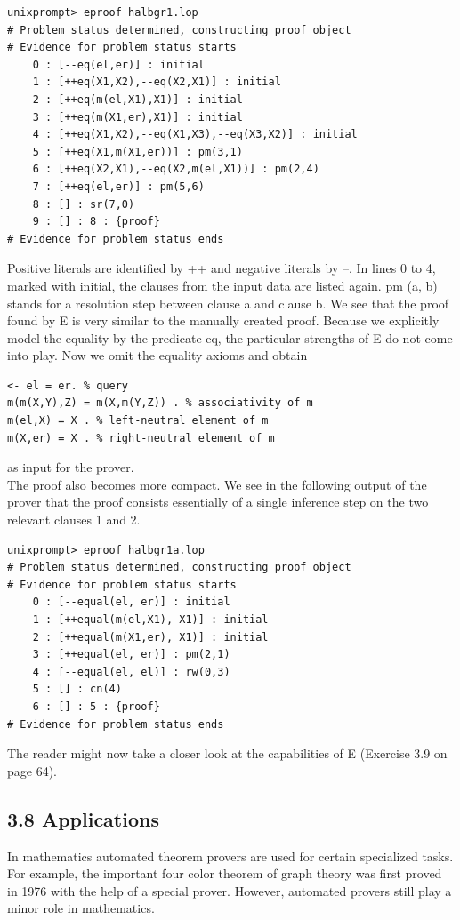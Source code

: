\documentclass[10pt]{article}
\begin{document}
\begin{verbatim}
unixprompt> eproof halbgr1.lop
# Problem status determined, constructing proof object
# Evidence for problem status starts
    0 : [--eq(el,er)] : initial
    1 : [++eq(X1,X2),--eq(X2,X1)] : initial
    2 : [++eq(m(el,X1),X1)] : initial
    3 : [++eq(m(X1,er),X1)] : initial
    4 : [++eq(X1,X2),--eq(X1,X3),--eq(X3,X2)] : initial
    5 : [++eq(X1,m(X1,er))] : pm(3,1)
    6 : [++eq(X2,X1),--eq(X2,m(el,X1))] : pm(2,4)
    7 : [++eq(el,er)] : pm(5,6)
    8 : [] : sr(7,0)
    9 : [] : 8 : {proof}
# Evidence for problem status ends
\end{verbatim}

Positive literals are identified by ++ and negative literals by --. In lines 0 to 4, marked with initial, the clauses from the input data are listed again. pm (a, b) stands for a resolution step between clause a and clause b. We see that the proof found by E is very similar to the manually created proof. Because we explicitly model the equality by the predicate eq, the particular strengths of E do not come into play. Now we omit the equality axioms and obtain

\begin{verbatim}
<- el = er. % query
m(m(X,Y),Z) = m(X,m(Y,Z)) . % associativity of m
m(el,X) = X . % left-neutral element of m
m(X,er) = X . % right-neutral element of m
\end{verbatim}

as input for the prover.\\
The proof also becomes more compact. We see in the following output of the prover that the proof consists essentially of a single inference step on the two relevant clauses 1 and 2.

\begin{verbatim}
unixprompt> eproof halbgr1a.lop
# Problem status determined, constructing proof object
# Evidence for problem status starts
    0 : [--equal(el, er)] : initial
    1 : [++equal(m(el,X1), X1)] : initial
    2 : [++equal(m(X1,er), X1)] : initial
    3 : [++equal(el, er)] : pm(2,1)
    4 : [--equal(el, el)] : rw(0,3)
    5 : [] : cn(4)
    6 : [] : 5 : {proof}
# Evidence for problem status ends
\end{verbatim}

The reader might now take a closer look at the capabilities of E (Exercise 3.9 on page 64).

\subsection*{3.8 Applications}
In mathematics automated theorem provers are used for certain specialized tasks. For example, the important four color theorem of graph theory was first proved in 1976 with the help of a special prover. However, automated provers still play a minor role in mathematics.
\end{document}
